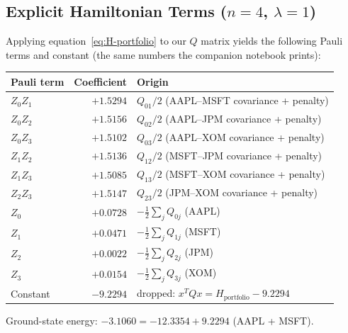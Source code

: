\documentclass[a4paper,11pt]{article}
\begin{document}
\subsection{Explicit Hamiltonian Terms ($n=4$, $\lambda=1$)}

Applying equation~\eqref{eq:H-portfolio} to our $Q$ matrix yields
the following Pauli terms and constant (the same numbers the companion
notebook prints):

\begin{center}
\begin{tabular}{lrl}
    \toprule
    Pauli term & Coefficient & Origin \\
    \midrule
    $Z_0 Z_1$ & $+1.5294$ & $Q_{01}/2$ (AAPL--MSFT covariance + penalty) \\
    $Z_0 Z_2$ & $+1.5156$ & $Q_{02}/2$ (AAPL--JPM covariance + penalty) \\
    $Z_0 Z_3$ & $+1.5102$ & $Q_{03}/2$ (AAPL--XOM covariance + penalty) \\
    $Z_1 Z_2$ & $+1.5136$ & $Q_{12}/2$ (MSFT--JPM covariance + penalty) \\
    $Z_1 Z_3$ & $+1.5085$ & $Q_{13}/2$ (MSFT--XOM covariance + penalty) \\
    $Z_2 Z_3$ & $+1.5147$ & $Q_{23}/2$ (JPM--XOM covariance + penalty) \\
    $Z_0$     & $+0.0728$ & $-\tfrac12\sum_j Q_{0j}$ (AAPL) \\
    $Z_1$     & $+0.0471$ & $-\tfrac12\sum_j Q_{1j}$ (MSFT) \\
    $Z_2$     & $+0.0022$ & $-\tfrac12\sum_j Q_{2j}$ (JPM) \\
    $Z_3$     & $+0.0154$ & $-\tfrac12\sum_j Q_{3j}$ (XOM) \\
    \midrule
    Constant  & $-9.2294$ & dropped: $x^TQx = H_\text{portfolio} - 9.2294$ \\
    \bottomrule
\end{tabular}
\end{center}

\noindent Ground-state energy: $-3.1060 = -12.3354 + 9.2294$ (AAPL + MSFT).
\end{document}
